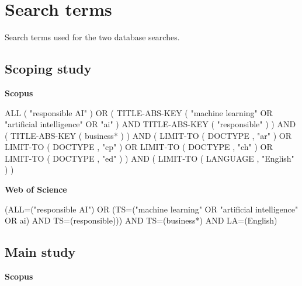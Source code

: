 \section{Search terms}
Search terms used for the two database searches.

\subsection{Scoping study}
\label{app:search-terms-pilot}

\textbf{Scopus}

\begin{verbatimBreakable}
ALL ( "responsible AI" )
OR (
TITLE-ABS-KEY ( "machine learning" OR "artificial intelligence" OR "ai" )
AND TITLE-ABS-KEY ( "responsible" )
)
AND (
TITLE-ABS-KEY ( business* )
)
AND (
LIMIT-TO ( DOCTYPE , "ar" )
OR LIMIT-TO ( DOCTYPE , "cp" )
OR LIMIT-TO ( DOCTYPE , "ch" )
OR LIMIT-TO ( DOCTYPE , "ed" )
)
AND (
LIMIT-TO ( LANGUAGE , "English" )
)
\end{verbatimBreakable}

\textbf{Web of Science}
\begin{verbatimBreakable}
(ALL=("responsible AI") OR (TS=("machine learning" OR "artificial intelligence" OR ai) AND TS=(responsible))) AND TS=(business*) AND LA=(English)
\end{verbatimBreakable}


\newpage
\subsection{Main study}
\label{app:search-terms-main}

\textbf{Scopus}

